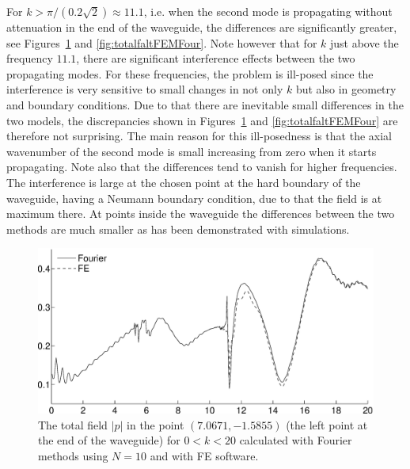 \documentclass[numreferences]{kluwer}
\providecommand{\abs}[1]{\left\lvert#1\right\rvert}
\begin{document}
For $k>\pi/(0.2\sqrt2)\approx11.1$, i.e. when the second mode is
propagating without attenuation in the end of the waveguide, the
differences are significantly greater, see
Figures~\ref{fig:FEMvsFour2} and \ref{fig:totalfaltFEMFour}. Note
however that for $k$ just above the frequency $11.1$, there are
significant interference effects between the two
propagating modes. For these frequencies, the problem is ill-posed
since the interference is very sensitive to small changes
in not only $k$ but also in geometry and boundary conditions. Due to that there are inevitable small differences in the two models, the discrepancies shown in Figures~\ref{fig:FEMvsFour2} and
\ref{fig:totalfaltFEMFour} are therefore not surprising. The main reason for this ill-posedness is that the axial wavenumber of the second mode is small increasing from zero when it starts propagating. Note also
that the differences tend to vanish for higher frequencies. The interference is large at the chosen point at the hard boundary of the waveguide, having a Neumann boundary condition, due to that the field is at maximum there. At points inside the waveguide the differences between the two methods are much smaller as has been demonstrated with simulations.
\begin{figure}[htb]
  \centering
  \includegraphics[width=\linewidth]{totalfaltFEMvsFourier2}
  \caption{The total field $\abs p$ in the point $(7.0671,-1.5855)$
    (the left point at the end of the waveguide) for $0<k<20$
    calculated with Fourier methods using $N=10$ and with FE
    software.}
  \label{fig:FEMvsFour2}
\end{figure}
\end{document}
